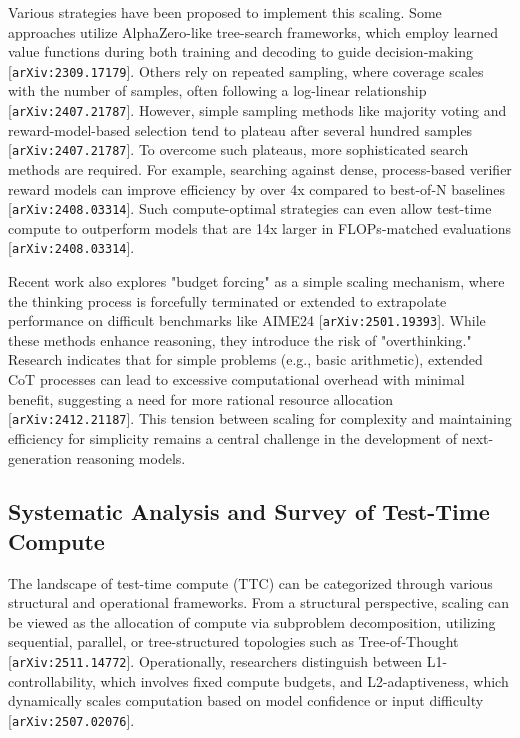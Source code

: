 \documentclass[11pt]{article}
\begin{document}
Various strategies have been proposed to implement this scaling. Some approaches utilize AlphaZero-like tree-search frameworks, which employ learned value functions during both training and decoding to guide decision-making [\texttt{arXiv:2309.17179}]. Others rely on repeated sampling, where coverage scales with the number of samples, often following a log-linear relationship [\texttt{arXiv:2407.21787}]. However, simple sampling methods like majority voting and reward-model-based selection tend to plateau after several hundred samples [\texttt{arXiv:2407.21787}]. To overcome such plateaus, more sophisticated search methods are required. For example, searching against dense, process-based verifier reward models can improve efficiency by over 4x compared to best-of-N baselines [\texttt{arXiv:2408.03314}]. Such compute-optimal strategies can even allow test-time compute to outperform models that are 14x larger in FLOPs-matched evaluations [\texttt{arXiv:2408.03314}].

Recent work also explores "budget forcing" as a simple scaling mechanism, where the thinking process is forcefully terminated or extended to extrapolate performance on difficult benchmarks like AIME24 [\texttt{arXiv:2501.19393}]. While these methods enhance reasoning, they introduce the risk of "overthinking." Research indicates that for simple problems (e.g., basic arithmetic), extended CoT processes can lead to excessive computational overhead with minimal benefit, suggesting a need for more rational resource allocation [\texttt{arXiv:2412.21187}]. This tension between scaling for complexity and maintaining efficiency for simplicity remains a central challenge in the development of next-generation reasoning models.

\subsection{Systematic Analysis and Survey of Test-Time Compute}

The landscape of test-time compute (TTC) can be categorized through various structural and operational frameworks. From a structural perspective, scaling can be viewed as the allocation of compute via subproblem decomposition, utilizing sequential, parallel, or tree-structured topologies such as Tree-of-Thought [\texttt{arXiv:2511.14772}]. Operationally, researchers distinguish between L1-controllability, which involves fixed compute budgets, and L2-adaptiveness, which dynamically scales computation based on model confidence or input difficulty [\texttt{arXiv:2507.02076}].
\end{document}
